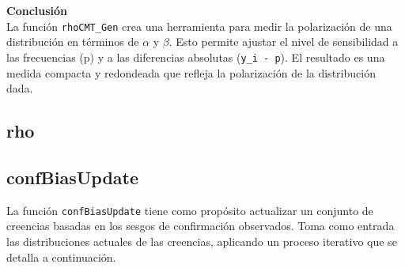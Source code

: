 \documentclass{article}
\begin{document}
	\textbf{Conclusión}\\

	La función \texttt{rhoCMT\_Gen} crea una herramienta para medir la polarización de una distribución en términos de $\alpha$ y $\beta$. Esto permite ajustar el nivel de sensibilidad a las frecuencias (p) y a las diferencias absolutas (\texttt{y\_i - p}). El resultado es una medida compacta y redondeada que refleja la polarización de la distribución dada.


    \subsection{rho}

\subsection{confBiasUpdate}
	
	La función \texttt{confBiasUpdate} tiene como propósito actualizar un conjunto de creencias basadas en los sesgos de confirmación observados. Toma como entrada las distribuciones actuales de las creencias, aplicando un proceso iterativo que se detalla a continuación.\\
	
\end{document}
